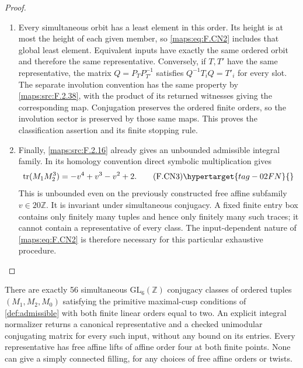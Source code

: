 \begin{proof}
\begin{enumerate}[label={$\langle1\rangle$\arabic*.}]
\item Every simultaneous orbit has a least element in this order.
Its height is at most the height of each given member, so
\eqref{maps:eq:F.CN2} includes that global least element.
Equivalent inputs have exactly the same ordered orbit and
therefore the same representative. Conversely, if $T,T'$ have
the same representative, the matrix
$Q=P_TP_{T'}^{-1}$ satisfies $Q^{-1}T_iQ=T'_i$ for every slot.
The separate involution convention has the same property by
\cref{maps:src:F.2.38}, with the product of its returned
witnesses giving the corresponding map. Conjugation preserves
the ordered finite orders, so the involution sector is preserved
by those same maps. This proves the classification assertion
and its finite stopping rule.

\item Finally, \ref{maps:src:F.2.16} already gives an unbounded admissible integral
family. In its homology convention direct symbolic
multiplication gives
\[
             \operatorname{tr}(M_1M_2^3)
                       =-v^4+v^3-v^2+2.                 \tag{F.CN3}\hypertarget{tag-02FN}{}\label{maps:eq:F.CN3}
\]
This is unbounded even on the previously constructed free
affine subfamily $v\in20\mathbb Z$. It is invariant under
simultaneous conjugacy. A fixed finite entry box contains
only finitely many tuples and hence only finitely many such
traces; it cannot contain a representative of every class.
The input-dependent nature of \eqref{maps:eq:F.CN2} is therefore necessary
for this particular exhaustive procedure.

\end{enumerate}
\end{proof}




\begin{theorem}\hypertarget{tag-02NT}{}\label{maps:src:F.2.38}


There are exactly 56 simultaneous $\mathrm{GL}_6(\mathbb Z)$
conjugacy classes of ordered tuples $(M_1,M_2,M_0)$ satisfying
the primitive maximal-cusp conditions of \cref{def:admissible} with both finite linear orders equal to two.  An explicit integral normalizer
returns a canonical representative and a checked unimodular
conjugating matrix for every such input, without any bound on
its entries.  Every representative has free affine lifts of
affine order four at both finite points.  None can give a
simply connected filling, for any choices of free affine
orders or twists.

\end{theorem}


